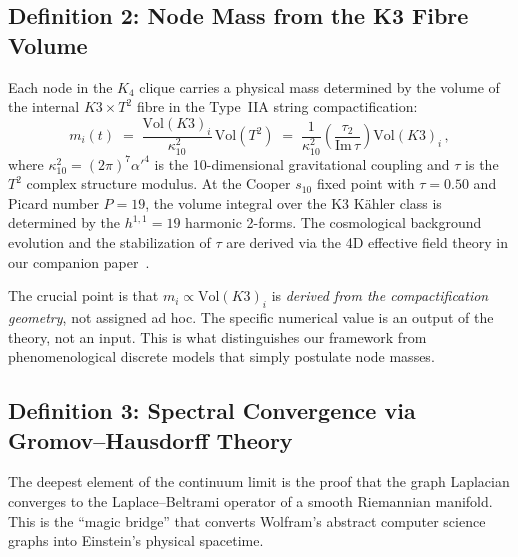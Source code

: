 \subsection{Definition 2: Node Mass from the K3 Fibre Volume}
\label{subsec:node_mass}

Each node in the $K_4$ clique carries a physical mass determined by the volume of the internal $K3 \times T^2$ fibre in the Type~IIA string compactification:
\begin{equation}
    m_i(t) \;=\; \frac{\mathrm{Vol}(K3)_i}{\kappa_{10}^2} \, \mathrm{Vol}(T^2) \;=\; \frac{1}{\kappa_{10}^2} \left(\frac{\tau_2}{\mathrm{Im}\,\tau}\right) \mathrm{Vol}(K3)_i\,,
    \label{eq:node_mass}
\end{equation}
where $\kappa_{10}^2 = (2\pi)^7 \alpha'^4$ is the 10-dimensional gravitational coupling and $\tau$ is the $T^2$ complex structure modulus.  At the Cooper $s_{10}$ fixed point with $\tau = 0.50$ and Picard number $P = 19$, the volume integral over the K3 K\"ahler class is determined by the $h^{1,1} = 19$ harmonic 2-forms. The cosmological background evolution and the stabilization of $\tau$ are derived via the 4D effective field theory in our companion paper~\cite{Callens2026Paper1}.

The crucial point is that $m_i \propto \mathrm{Vol}(K3)_i$ is \emph{derived from the compactification geometry}, not assigned ad hoc.  The specific numerical value is an output of the theory, not an input.  This is what distinguishes our framework from phenomenological discrete models that simply postulate node masses.

\subsection{Definition 3: Spectral Convergence via Gromov--Hausdorff Theory}
\label{subsec:spectral_convergence}

The deepest element of the continuum limit is the proof that the graph Laplacian converges to the Laplace--Beltrami operator of a smooth Riemannian manifold.  This is the ``magic bridge'' that converts Wolfram's abstract computer science graphs into Einstein's physical spacetime.


